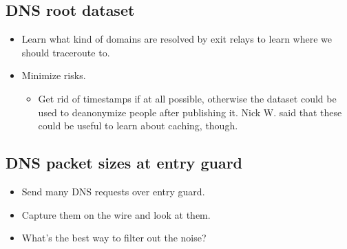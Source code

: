 \subsection{DNS root dataset}
\label{sec:dns-root-dataset}
\begin{itemize}
	\item Learn what kind of domains are resolved by exit relays to learn where
		we should traceroute to.
	\item Minimize risks.
	\begin{itemize}
		\item Get rid of timestamps if at all possible, otherwise the dataset
			could be used to deanonymize people after publishing it.  Nick W.
			said that these could be useful to learn about caching, though.
	\end{itemize}
\end{itemize}

\subsection{DNS packet sizes at entry guard}
\begin{itemize}
	\item Send many DNS requests over entry guard.
	\item Capture them on the wire and look at them.
	\item What's the best way to filter out the noise?
\end{itemize}
